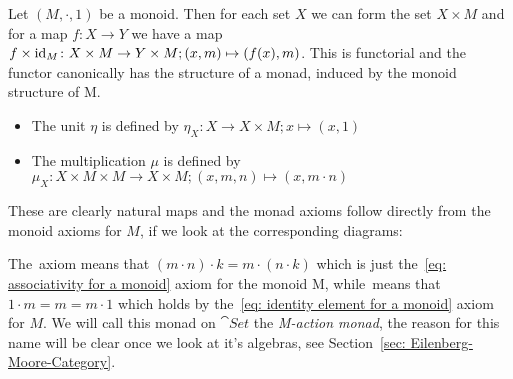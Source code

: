 \begin{example}
    Let $(M,\cdot,1)$ be a monoid. Then for each set $X$ we can form the set $X \times M$ and 
    for a map $f \colon X \to Y$ we have a map $f \times \operatorname{id}_M \colon X \times M \to Y \times M;
    (x,m) \mapsto (f(x),m)$. This is functorial and the functor canonically has the structure of 
    a monad, induced by the monoid structure of M. 
    \begin{itemize}
        \item The unit $\eta$ is defined by
            $\eta_X \colon X \to X \times M;
            x \mapsto (x,1)$
        \item The multiplication $\mu$ is defined by 
           $ \mu_X \colon X \times M \times M \to X \times M;
            (x,m,n) \mapsto (x,m \cdot n)$
    \end{itemize}
    These are clearly natural maps and the monad axioms follow directly from the monoid axioms for $M$,
    if we look at the corresponding diagrams:
    \begin{figure}[H]
    \small
    \centering
    \begin{subfigure}{0.46\textwidth}
    \centering 
    \end{subfigure}
    \hspace{2em}
    \begin{subfigure}{0.47\textwidth}
    \centering
    \end{subfigure}
    \end{figure}
    The~ axiom means that $(m \cdot n) \cdot k = m \cdot (n \cdot k)$ 
    which is just the~\ref{eq: associativity for a monoid} axiom for the monoid M,
    while~ means that $1\cdot m = m = m \cdot 1$ which holds by
    the~\ref{eq: identity element for a monoid} axiom for $M$.
    We will call this monad on $\cat{Set}$ the \textit{M-action monad}, the reason for this name will
    be clear once we look at it's algebras, see Section~\ref{sec: Eilenberg-Moore-Category}.
\end{example}
